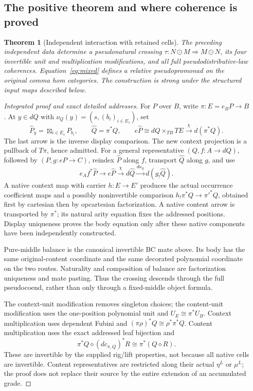 \documentclass[11pt,a4paper]{article}
\newtheorem{theorem}{Theorem}[section]
\theoremstyle{definition}
\begin{document}
\subsection{The positive theorem and where coherence is proved}
\begin{theorem}[Independent interaction with retained cells]\label{thm:independent}
The preceding independent data determine a pseudonatural crossing
\(\tau:N\odot M\Rightarrow M\odot N\), its four invertible unit and
multiplication modifications, and all full pseudodistributive-law
coherences. Equation~\eqref{eq:mixed} defines a relative pseudopromonad
on the original comma hom categories. The construction is strong under
the structured input maps described below.
\end{theorem}
\begin{proof}[Integrated proof and exact detailed addresses]
For \(P\) over \(B\), write \(\pi:E=e_BP\to B\). At
\(y\in dQ\) with \(\nu_Q(y)=(s,(b_i)_{i\in E_s})\), set
\[
 \widehat P_y=\boxtimes_{i\in E_s}P_{b_i},\qquad
 \widehat Q=\pi^*Q,\qquad
 e\widehat P\cong dQ\times_{TB}TE\xrightarrow{\chi}d(\pi^*Q).
\]
The last arrow is the inverse display comparison. The new context
projection is a pullback of \(T\pi\), hence admitted. For a general
representative \((Q,f:A\to dQ)\), followed by
\((P,g:eP\to C)\), reindex \(\widehat P\) along \(f\), transport
\(\widehat Q\) along \(g\), and use
\[
 e_Af^*\widehat P\to e\widehat P\xrightarrow{\chi}d\widehat Q
                       \xrightarrow{d\kappa_g}d(g_!\widehat Q).
\]
A native context map with carrier \(h:E\to E'\) produces the actual
occurrence coefficient maps and a possibly noninvertible comparison
\(h_!\pi^*Q\to\pi'^*Q\), obtained first by cartesian then by
opcartesian factorization. A native content arrow is transported by
\(\pi^*\); its natural arity equation fixes the addressed positions.
Display uniqueness proves the body equation only after these native
components have been independently constructed.

Pure-middle balance is the canonical invertible BC mate above. Its body
has the same original-content coordinate and the same decorated
polynomial coordinate on the two routes. Naturality and composition of
balance are factorization uniqueness and mate pasting. Thus the crossing
descends through the full pseudocoend, rather than only through a
fixed-middle object formula.

The context-unit modification removes singleton choices; the content-unit
modification uses the one-position polynomial unit and
\(U_E\cong\pi^*U_B\). Context multiplication uses dependent Fubini
and \((\pi\rho)^*Q\cong\rho^*\pi^*Q\). Content multiplication
uses the exact addressed leaf bijection and
\[
 \pi^*Q\diamond (dc_{\pi,Q})^*R\cong\pi^*(Q\diamond R).
\]
These are invertible by the supplied rig/lift properties, not because
all native cells are invertible. Content representatives are restricted
along their actual \(\eta^L\) or \(\mu^L\); the proof does not replace
their source by the entire extension of an accumulated grade.


\end{proof}
\end{document}
